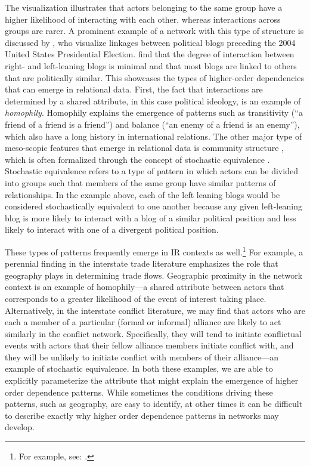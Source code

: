 The visualization illustrates that actors belonging to the same group have a higher likelihood of interacting with each other, whereas interactions across groups are rarer. A prominent example of a network with this type of structure is discussed by \citet{adamic:glance:2005}, who visualize linkages between political blogs preceding the 2004 United States Presidential Election. \citeauthor{adamic:glance:2005} find that the degree of interaction between right- and left-leaning blogs is minimal and that most blogs are linked to others that are politically similar. This showcases the types of higher-order dependencies that can emerge in relational data. First, the fact that interactions are determined by a shared attribute, in this case political ideology, is an example of \textit{homophily}. Homophily explains the emergence of patterns such as transitivity (``a friend of a friend is a friend'') and balance (``an enemy of a friend is an enemy''), which also have a long history in international relations. The other major type of meso-scopic features that emerge in relational data is community structure \citep{mucha:etal:2010}, which is often formalized through the concept of stochastic equivalence \citep{anderson:etal:1992}. Stochastic equivalence refers to a type of pattern in which actors can be divided into groups such that members of the same group have similar patterns of relationships. In the example above, each of the left leaning blogs would be considered stochastically equivalent to one another because any given left-leaning blog is more likely to interact with a blog of a similar political position and less likely to interact with one of a divergent political position.

These types of patterns frequently emerge in IR contexts as well.\footnote{For example, see: \citet{manger:etal:2012, kinne:2013, chyzh:2016}.} For example, a perennial finding in the interstate trade literature emphasizes the role that geography plays in determining trade flows. Geographic proximity in the network context is an example of homophily---a shared attribute between actors that corresponds to a greater likelihood of the event of interest taking place. Alternatively, in the interstate conflict literature, we may find that actors who are each a member of a particular (formal or informal) alliance are likely to act similarly in the conflict network. Specifically, they will tend to initiate conflictual events with actors that their fellow alliance members initiate conflict with, and they will be unlikely to initiate conflict with members of their alliance---an example of stochastic equivalence. In both these examples, we are able to explicitly parameterize the attribute that might explain the emergence of higher order dependence patterns. While sometimes the conditions driving these patterns, such as geography, are easy to identify, at other times it can be difficult to describe exactly why higher order dependence patterns in networks may develop.


